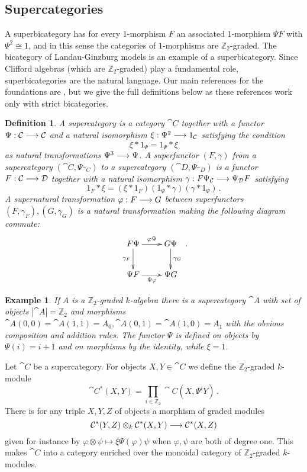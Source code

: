 \documentclass[english,letter paper,12pt,leqno]{article}
\theoremstyle{example}
\newtheorem{definition}[theorem]{Definition}
\newtheorem{example}[theorem]{Example}
\numberwithin{equation}{section}
\begin{document}
\subsection{Supercategories}

A superbicategory has for every $1$-morphism $F$ an associated $1$-morphism $\Psi F$ with $\Psi^2 \cong 1$, and in this sense the categories of $1$-morphisms are $\mathbb{Z}_2$-graded. The bicategory of Landau-Ginzburg models is an example of a superbicategory. Since Clifford algebras (which are $\mathbb{Z}_2$-graded) play a fundamental role, superbicategories are the natural language. Our main references for the foundations are \cite{ellis_lauda,kang,kang2}, but we give the full definitions below as these references work only with strict bicategories.

\begin{definition} A \emph{supercategory} is a category $\cat{C}$ together with a functor $\Psi: \mathcal{C} \longrightarrow \mathcal{C}$ and a natural isomorphism $\xi: \Psi^2 \longrightarrow 1_{\mathcal{C}}$ satisfying the condition
\[
\xi * 1_{\Psi} = 1_{\Psi} * \xi
\]
as natural transformations $\Psi^3 \longrightarrow \Psi$. A \emph{superfunctor} $(F, \gamma)$ from a supercategory $(\cat{C}, \Psi_{\cat{C}})$ to a supercategory $(\cat{D}, \Psi_{\cat{D}})$ is a functor $F: \mathcal{C} \longrightarrow \mathcal{D}$ together with a natural isomorphism $\gamma: F \Psi_{\mathcal{C}} \longrightarrow \Psi_{\mathcal{D}} F$ satisfying
\[
1_F * \xi = (\xi * 1_F ) ( 1_{\Psi} * \gamma ) ( \gamma * 1_{\Psi} )\,.
\]
A \emph{supernatural transformation} $\varphi: F \longrightarrow G$ between superfunctors $(F,\gamma_F), (G,\gamma_G)$ is a natural transformation making the following diagram commute:
\[
\xymatrix{
F \Psi \ar[r]^-{\varphi \Psi}\ar[d]_-{\gamma_F} & G \Psi \ar[d]^-{\gamma_G}\\
\Psi F \ar[r]_-{\Psi \varphi} & \Psi G
}\,.
\] 
\end{definition}

\begin{example}\label{example:Aassup} If $A$ is a $\mathbb{Z}_2$-graded $k$-algebra there is a supercategory $\cat{A}$ with set of objects $|\cat{A}| = \mathbb{Z}_2$ and morphisms $\cat{A}(0,0) = \cat{A}(1,1) = A_0, \cat{A}(0,1) = \cat{A}(1,0) = A_1$ with the obvious composition and addition rules. The functor $\Psi$ is defined on objects by $\Psi(i) = i+1$ and on morphisms by the identity, while $\xi = 1$.
\end{example}

Let $\cat{C}$ be a supercategory. For objects $X,Y \in \cat{C}$ we define the $\mathbb{Z}_2$-graded $k$-module
\[
\cat{C}^*(X,Y) = \prod_{i \in \mathbb{Z}_2} \cat{C}(X, \Psi^i Y)\,.
\]
There is for any triple $X,Y,Z$ of objects a morphism of graded modules
\[
\mathcal{C}^*(Y,Z) \otimes_k \mathcal{C}^*(X, Y) \longrightarrow \mathcal{C}^*(X,Z)
\]
given for instance by $\varphi \otimes \psi \mapsto \xi \Psi( \varphi ) \psi$ when $\varphi, \psi$ are both of degree one. This makes $\cat{C}$ into a category enriched over the monoidal category of $\mathbb{Z}_2$-graded $k$-modules.
\end{document}
